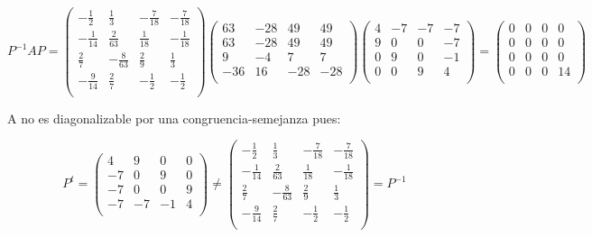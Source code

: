 \documentclass[11pt, a4paper]{article}
\newif\IfInSansMode
\theoremstyle{theorem-style}
\theoremstyle{definition-style}
\theoremstyle{remark-style}
\theoremstyle{example-style}
\begin{document}
$$P^{-1}AP = \begin{pmatrix}
-\frac{1}{2} & \frac{1}{3} & -\frac{7}{18} & -\frac{7}{18}\\
-\frac{1}{14} & \frac{2}{63} & \frac{1}{18} & -\frac{1}{18}\\
\frac{2}{7} & -\frac{8}{63} & \frac{2}{9} & \frac{1}{3}\\
-\frac{9}{14} & \frac{2}{7} & -\frac{1}{2} & -\frac{1}{2} \\ 
\end{pmatrix}\begin{pmatrix}
63 & -28 & 49 & 49\\
63 & -28 & 49 & 49\\
9 & -4 & 7 & 7\\
-36 & 16 & -28 & -28 \\
\end{pmatrix}\begin{pmatrix}
4 & -7 & -7 & -7\\
9 & 0 & 0 & -7\\
0 & 9 & 0 & -1\\
0 & 0 & 9 & 4 \\ 
\end{pmatrix}=\begin{pmatrix}
0 & 0 & 0 & 0\\
0 & 0 & 0 & 0\\
0 & 0 & 0 & 0\\
0 & 0 & 0 & 14 \\
\end{pmatrix}
$$

A no es diagonalizable por una congruencia-semejanza pues:

$$P^t = \begin{pmatrix}
4 & 9 & 0 & 0\\
-7 & 0 & 9 & 0\\
-7 & 0 & 0 & 9\\
-7 & -7 & -1 & 4 \\ 
\end{pmatrix} \neq 
\begin{pmatrix}
-\frac{1}{2} & \frac{1}{3} & -\frac{7}{18} & -\frac{7}{18}\\
-\frac{1}{14} & \frac{2}{63} & \frac{1}{18} & -\frac{1}{18}\\
\frac{2}{7} & -\frac{8}{63} & \frac{2}{9} & \frac{1}{3}\\
-\frac{9}{14} & \frac{2}{7} & -\frac{1}{2} & -\frac{1}{2} \\ 
\end{pmatrix} = P^{-1}$$


\end{document}
